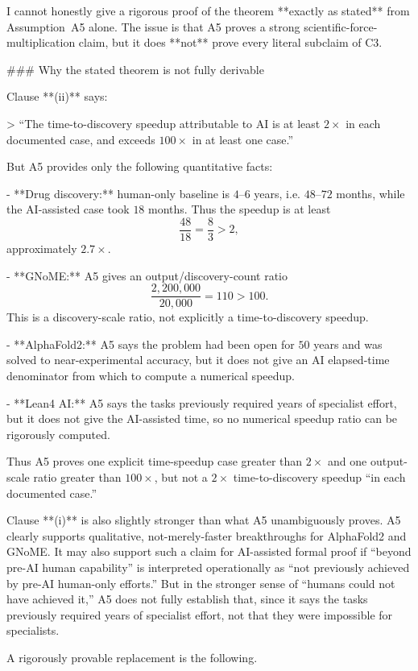 I cannot honestly give a rigorous proof of the theorem **exactly as stated** from Assumption~A5 alone. The issue is that A5 proves a strong scientific-force-multiplication claim, but it does **not** prove every literal subclaim of C3.

### Why the stated theorem is not fully derivable

Clause **(ii)** says:

> “The time-to-discovery speedup attributable to AI is at least $2\times$ in each documented case, and exceeds $100\times$ in at least one case.”

But A5 provides only the following quantitative facts:

- **Drug discovery:** human-only baseline is $4$--$6$ years, i.e. $48$--$72$ months, while the AI-assisted case took $18$ months. Thus the speedup is at least  
  \[
  \frac{48}{18}=\frac{8}{3}>2,
  \]
  approximately $2.7\times$.

- **GNoME:** A5 gives an output/discovery-count ratio  
  \[
  \frac{2{,}200{,}000}{20{,}000}=110>100.
  \]
  This is a discovery-scale ratio, not explicitly a time-to-discovery speedup.

- **AlphaFold2:** A5 says the problem had been open for $50$ years and was solved to near-experimental accuracy, but it does not give an AI elapsed-time denominator from which to compute a numerical speedup.

- **Lean4 AI:** A5 says the tasks previously required years of specialist effort, but it does not give the AI-assisted time, so no numerical speedup ratio can be rigorously computed.

Thus A5 proves one explicit time-speedup case greater than $2\times$ and one output-scale ratio greater than $100\times$, but not a $2\times$ time-to-discovery speedup “in each documented case.”

Clause **(i)** is also slightly stronger than what A5 unambiguously proves. A5 clearly supports qualitative, not-merely-faster breakthroughs for AlphaFold2 and GNoME. It may also support such a claim for AI-assisted formal proof if “beyond pre-AI human capability” is interpreted operationally as “not previously achieved by pre-AI human-only efforts.” But in the stronger sense of “humans could not have achieved it,” A5 does not fully establish that, since it says the tasks previously required years of specialist effort, not that they were impossible for specialists.

A rigorously provable replacement is the following.

